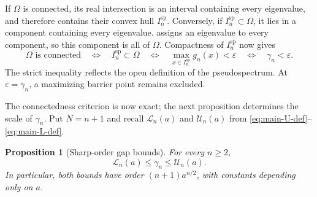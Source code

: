 \documentclass[12pt,anonymous]{iopjournal}
\numberwithin{equation}{section}
\newtheorem{proposition}[proposition]{Proposition}
\theoremstyle{remark}
\begin{document}
If \(\Omega\) is connected, its real intersection is an interval
containing every eigenvalue, and therefore contains their convex hull
\(I_n^{\mathrm{sp}}\).  Conversely, if
\(I_n^{\mathrm{sp}}\subset\Omega\), it lies in a component containing every
eigenvalue.   assigns an eigenvalue to every component,
so this component is all of \(\Omega\).  Compactness of
\(I_n^{\mathrm{sp}}\) now gives
\begin{equation}\label{eq:connected-iff-gamma}
 \Omega\text{ is connected}
 \quad\Longleftrightarrow\quad
 I_n^{\mathrm{sp}}\subset\Omega
 \quad\Longleftrightarrow\quad
 \max_{x\in I_n^{\mathrm{sp}}}g_n(x)<\varepsilon
 \quad\Longleftrightarrow\quad
 \gamma_n<\varepsilon.
\end{equation}
The strict inequality reflects the open definition of the pseudospectrum.
At \(\varepsilon=\gamma_n\), a maximizing barrier point remains excluded.

The connectedness criterion is now exact; the next proposition determines
the scale of \(\gamma_n\).  Put \(N=n+1\) and recall
\(\mathcal L_n(a)\) and \(\mathcal U_n(a)\) from
\eqref{eq:main-U-def}--\eqref{eq:main-L-def}.

\begin{proposition}[Sharp-order gap bounds]\label{prop:gap-bounds}
For every \(n\geq2\),
\begin{equation}\label{eq:gamma-LU}
 \mathcal L_n(a)\leq\gamma_n\leq\mathcal U_n(a).
\end{equation}
In particular, both bounds have order \((n+1)a^{n/2}\), with constants
depending only on \(a\).
\end{proposition}
\end{document}
